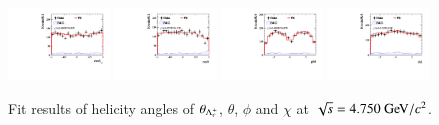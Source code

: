 \begin{figure}[H]\centering
    \includegraphics[width=0.24\textwidth]{figure/polarimetery/angular_plots/pkpi_4750_cos_theta0.pdf}
    \includegraphics[width=0.24\textwidth]{figure/polarimetery/angular_plots/pkpi_4750_cos_theta1.pdf}
    \includegraphics[width=0.24\textwidth]{figure/polarimetery/angular_plots/pkpi_4750_phi1.pdf}
    \includegraphics[width=0.24\textwidth]{figure/polarimetery/angular_plots/pkpi_4750_phi2.pdf}
    \caption{Fit results of helicity angles of $\theta_{\Lambda_{c}^{+}}$, $\theta$, $\phi$ and $\chi$ at $\sqrt{s} = 4.750\gev/c^2$.}
\label{fig:fit_angular_s8}
\end{figure}

